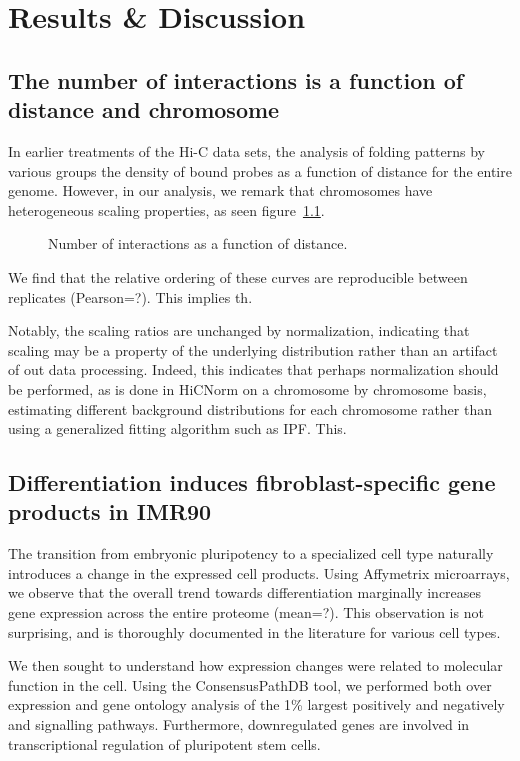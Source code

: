 
\chapter{Results \& Discussion}

\section*{The number of interactions is a function of distance and chromosome}
In earlier treatments of the Hi-C data sets, the analysis of folding patterns by various groups\cite{imakaev2012}\cite{ren2013}
the density of bound probes as a function of distance for the entire genome.  However, in our analysis, we remark that chromosomes
have heterogeneous scaling properties, as seen figure~\ref{fig:interactionScaling}.

\begin{figure}[h]
  \caption{Number of interactions as a function of distance.}\label{fig:interactionScaling}
\end{figure}

We find that the relative ordering of these curves are reproducible between replicates (Pearson=?).  This implies th.

Notably, the scaling ratios are unchanged by normalization, indicating that scaling may be a property of the underlying distribution
rather than an artifact of out data processing.  Indeed, this indicates that perhaps normalization should be performed, as is
done in HiCNorm\cite{} on a chromosome by chromosome basis, estimating different background distributions for each chromosome
rather than using a generalized fitting algorithm such as IPF\@.  This.

\section*{Differentiation induces fibroblast-specific gene products in IMR90}

The transition from embryonic pluripotency to a specialized cell type naturally introduces a change in the expressed cell products.
Using Affymetrix microarrays, we observe that the overall trend towards differentiation marginally increases gene expression across
the entire proteome (mean=?).  This observation is not surprising, and is thoroughly documented in the literature\cite{tuomela2012}
for various cell types.

We then sought to understand how expression changes were related to molecular function in the cell.  Using the ConsensusPathDB
tool\cite{kamburov2012}, we performed both over expression and gene ontology analysis of the 1\%  largest positively and negatively
and signalling pathways.  Furthermore, downregulated genes are involved in transcriptional regulation of pluripotent stem cells.

